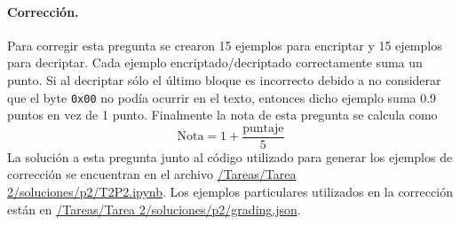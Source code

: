 \medskip

\paragraph{Corrección.}
Para corregir esta pregunta se crearon 15 ejemplos para encriptar y 15 ejemplos para decriptar. Cada ejemplo encriptado/decriptado correctamente suma un punto. Si al decriptar sólo el último bloque es incorrecto debido a no considerar que el byte \texttt{0x00} no podía ocurrir en el texto, entonces dicho ejemplo suma 0.9 puntos en vez de 1 punto. Finalmente la nota de esta pregunta se calcula como
$$\text{Nota} = 1+\frac{\text{puntaje}}{5}$$
La solución a esta pregunta junto al código utilizado para generar los ejemplos de corrección se encuentran en el archivo \href{https://github.com/UC-IIC3253/2022/tree/main/Tareas/Tarea%202/soluciones/p2/T2P2.ipynb}{/Tareas/Tarea 2/soluciones/p2/T2P2.ipynb}. Los ejemplos particulares utilizados en la corrección están en \href{https://github.com/UC-IIC3253/2022/tree/main/Tareas/Tarea%202/soluciones/p2/grading.json}{/Tareas/Tarea 2/soluciones/p2/grading.json}.
\medskip

